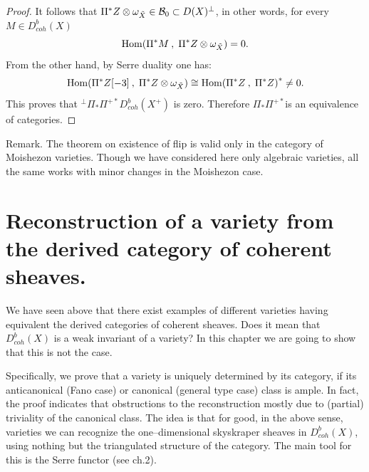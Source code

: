 \documentclass[12pt]{article}
\def\db#1{ D^b_{coh}({#1})}
\def\h#1,#2{{\rm Hom}({#1}\:,\; {#2})}
\begin{document}
\begin{proof}
It follows that $\Pi^*Z\otimes\omega_{\tilde X}\in{\cal B}_0\subset D(X)^{\perp}$, in other words, for every $M\in\db{X}$
$$
{\h \Pi^*M, {\Pi^*Z\otimes\omega_{\tilde X}}}=0.
$$
From the other hand, by Serre duality one has:
$$
{\h \Pi^*Z[-3], {\Pi^*Z\otimes\omega_{\tilde X}}}\cong{\h \Pi^*Z, {\Pi^*Z}}^*\ne 0.
$$
This proves that  ${}^{\perp}\Pi_*\Pi^{+*}\db{X^+}$ is zero.
Therefore $\Pi_*\Pi^{+*}$is an equivalence of categories.
\end{proof}

\bigskip

{\sc Remark.} The theorem on existence  of flip is valid only in the category of Moishezon varieties. Though we have considered here only algebraic varieties, all the same works with minor changes in the Moishezon case.















\section{Reconstruction of a variety from the derived category of coherent sheaves.}

We have seen above that there exist examples of different varieties having equivalent the derived categories of coherent sheaves. Does it mean that $\db{X}$ is a weak invariant of a variety? In this chapter we are going to show that this is not the case.

Specifically, we prove that a variety is uniquely determined by its category, if its anticanonical (Fano case) or canonical (general type case) class is ample. In fact, the proof indicates that obstructions to the reconstruction mostly due to (partial) triviality of the canonical class. The idea is that for good, in the above sense, varieties we can recognize the one--dimensional skyskraper sheaves in $\db{X}$, using nothing but the triangulated structure of the category. The main tool for this is the Serre functor (see ch.2).
\end{document}
